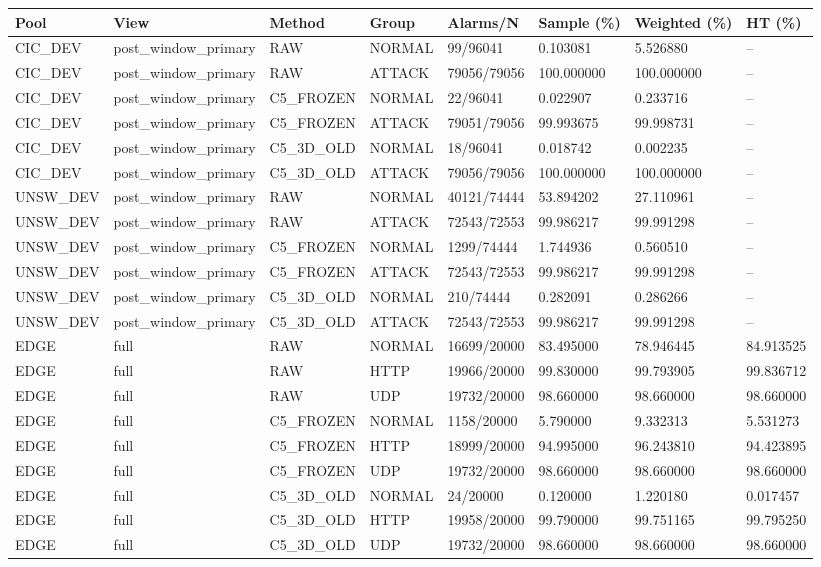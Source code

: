 \begin{tabular}{llllllll}
\hline
Pool & View & Method & Group & Alarms/N & Sample (\%) & Weighted (\%) & HT (\%) \\
\hline
CIC\_DEV & post\_window\_primary & RAW & NORMAL & 99/96041 & 0.103081 & 5.526880 & -- \\
CIC\_DEV & post\_window\_primary & RAW & ATTACK & 79056/79056 & 100.000000 & 100.000000 & -- \\
CIC\_DEV & post\_window\_primary & C5\_FROZEN & NORMAL & 22/96041 & 0.022907 & 0.233716 & -- \\
CIC\_DEV & post\_window\_primary & C5\_FROZEN & ATTACK & 79051/79056 & 99.993675 & 99.998731 & -- \\
CIC\_DEV & post\_window\_primary & C5\_3D\_OLD & NORMAL & 18/96041 & 0.018742 & 0.002235 & -- \\
CIC\_DEV & post\_window\_primary & C5\_3D\_OLD & ATTACK & 79056/79056 & 100.000000 & 100.000000 & -- \\
UNSW\_DEV & post\_window\_primary & RAW & NORMAL & 40121/74444 & 53.894202 & 27.110961 & -- \\
UNSW\_DEV & post\_window\_primary & RAW & ATTACK & 72543/72553 & 99.986217 & 99.991298 & -- \\
UNSW\_DEV & post\_window\_primary & C5\_FROZEN & NORMAL & 1299/74444 & 1.744936 & 0.560510 & -- \\
UNSW\_DEV & post\_window\_primary & C5\_FROZEN & ATTACK & 72543/72553 & 99.986217 & 99.991298 & -- \\
UNSW\_DEV & post\_window\_primary & C5\_3D\_OLD & NORMAL & 210/74444 & 0.282091 & 0.286266 & -- \\
UNSW\_DEV & post\_window\_primary & C5\_3D\_OLD & ATTACK & 72543/72553 & 99.986217 & 99.991298 & -- \\
EDGE & full & RAW & NORMAL & 16699/20000 & 83.495000 & 78.946445 & 84.913525 \\
EDGE & full & RAW & HTTP & 19966/20000 & 99.830000 & 99.793905 & 99.836712 \\
EDGE & full & RAW & UDP & 19732/20000 & 98.660000 & 98.660000 & 98.660000 \\
EDGE & full & C5\_FROZEN & NORMAL & 1158/20000 & 5.790000 & 9.332313 & 5.531273 \\
EDGE & full & C5\_FROZEN & HTTP & 18999/20000 & 94.995000 & 96.243810 & 94.423895 \\
EDGE & full & C5\_FROZEN & UDP & 19732/20000 & 98.660000 & 98.660000 & 98.660000 \\
EDGE & full & C5\_3D\_OLD & NORMAL & 24/20000 & 0.120000 & 1.220180 & 0.017457 \\
EDGE & full & C5\_3D\_OLD & HTTP & 19958/20000 & 99.790000 & 99.751165 & 99.795250 \\
EDGE & full & C5\_3D\_OLD & UDP & 19732/20000 & 98.660000 & 98.660000 & 98.660000 \\
\hline
\end{tabular}
